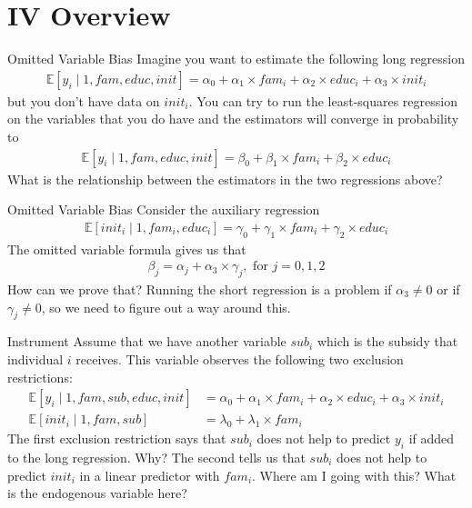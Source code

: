 \section{IV Overview}

\begin{frame}{Omitted Variable Bias}
    Imagine you want to estimate the following long regression
    \begin{align*}
        \mathbb{E}[y_i \mid 1, fam, educ, init] = \alpha_0 + \alpha_1 \times fam_i + \alpha_2 \times educ_i + \alpha_3 \times init_i
    \end{align*}
    but you don't have data on $init_i$. You can try to run the least-squares regression on the variables that you do have and the estimators will converge in probability to
    \begin{align*}
        \mathbb{E}[y_i \mid 1, fam, educ, init] = \beta_0 + \beta_1 \times fam_i + \beta_2 \times educ_i
    \end{align*}
    What is the relationship between the estimators in the two regressions above?
\end{frame}

\begin{frame}{Omitted Variable Bias}
    Consider the auxiliary regression
    \begin{align*}
        \mathbb{E}[init_i \mid 1, fam_i, educ_i] = \gamma_0 + \gamma_1 \times fam_i + \gamma_2 \times educ_i
    \end{align*}
    The omitted variable formula gives us that
    \begin{align*}
        \beta_j = \alpha_j + \alpha_3 \times \gamma_j, \text{ for } j = 0, 1, 2
    \end{align*}
    How can we prove that? Running the short regression is a problem if $\alpha_3 \neq 0$ or if $\gamma_j \neq 0$, so we need to figure out a way around this.
\end{frame}

\begin{frame}{Instrument}
    Assume that we have another variable $sub_i$ which is the subsidy that individual $i$ receives. This variable observes the following two exclusion restrictions:
    \begin{align*}
        \mathbb{E}[y_i \mid 1, fam, sub, educ, init] &= \alpha_0 + \alpha_1 \times fam_i + \alpha_2 \times educ_i + \alpha_3 \times init_i
        \\
        \mathbb{E}[init_i \mid 1, fam, sub] &= \lambda_0 + \lambda_1 \times fam_i
    \end{align*}
    The first exclusion restriction says that $sub_i$ does not help to predict $y_i$ if added to the long regression. Why? The second tells us that $sub_i$ does not help to predict $init_i$ in a linear predictor with $fam_i$. Where am I going with this? What is the endogenous variable here?
\end{frame}

